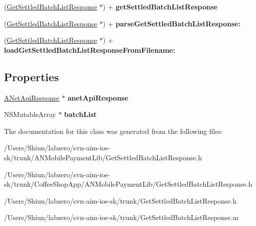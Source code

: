 \begin{DoxyCompactItemize}
\item 
\hypertarget{interface_get_settled_batch_list_response_a9d003bb648dcac34305e9270be4b0bc2}{
(\hyperlink{interface_get_settled_batch_list_response}{GetSettledBatchListResponse} $\ast$) + {\bfseries getSettledBatchListResponse}}
\label{interface_get_settled_batch_list_response_a9d003bb648dcac34305e9270be4b0bc2}

\item 
\hypertarget{interface_get_settled_batch_list_response_ab82d190eab8c684af8855277f747ee9b}{
(\hyperlink{interface_get_settled_batch_list_response}{GetSettledBatchListResponse} $\ast$) + {\bfseries parseGetSettledBatchListResponse:}}
\label{interface_get_settled_batch_list_response_ab82d190eab8c684af8855277f747ee9b}

\item 
\hypertarget{interface_get_settled_batch_list_response_a48381e3e6e9fdbd6da3bcee71d7a40ad}{
(\hyperlink{interface_get_settled_batch_list_response}{GetSettledBatchListResponse} $\ast$) + {\bfseries loadGetSettledBatchListResponseFromFilename:}}
\label{interface_get_settled_batch_list_response_a48381e3e6e9fdbd6da3bcee71d7a40ad}

\end{DoxyCompactItemize}
\subsection*{Properties}
\begin{DoxyCompactItemize}
\item 
\hypertarget{interface_get_settled_batch_list_response_ae421209b0deca96e9850f1592e9fe29a}{
\hyperlink{interface_a_net_api_response}{ANetApiResponse} $\ast$ {\bfseries anetApiResponse}}
\label{interface_get_settled_batch_list_response_ae421209b0deca96e9850f1592e9fe29a}

\item 
\hypertarget{interface_get_settled_batch_list_response_a41f17336d61f23b783eaa1341f455df9}{
NSMutableArray $\ast$ {\bfseries batchList}}
\label{interface_get_settled_batch_list_response_a41f17336d61f23b783eaa1341f455df9}

\end{DoxyCompactItemize}


The documentation for this class was generated from the following files:\begin{DoxyCompactItemize}
\item 
/Users/Shiun/labzero/svn-\/aim-\/ios-\/sk/trunk/ANMobilePaymentLib/GetSettledBatchListResponse.h\item 
/Users/Shiun/labzero/svn-\/aim-\/ios-\/sk/trunk/CoffeeShopApp/ANMobilePaymentLib/GetSettledBatchListResponse.h\item 
/Users/Shiun/labzero/svn-\/aim-\/ios-\/sk/trunk/GetSettledBatchListResponse.h\item 
/Users/Shiun/labzero/svn-\/aim-\/ios-\/sk/trunk/GetSettledBatchListResponse.m\end{DoxyCompactItemize}
